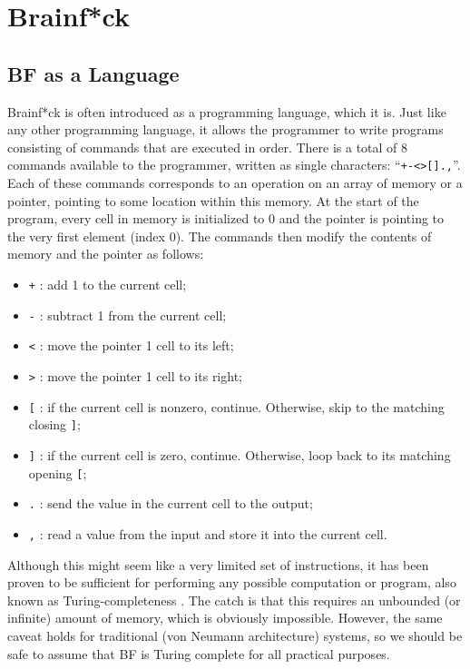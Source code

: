 \section{Brainf*ck}\label{section:brainfck}                                                       
\subsection{BF as a Language}
Brainf*ck is often introduced as a programming language, which it is. Just like any other programming language, it allows the programmer to write programs consisting of commands that are executed in order. There is a total of 8 commands available to the programmer, written as single characters: ``\texttt{+-<>[].,}''. Each of these commands corresponds to an operation on an array of memory or a pointer, pointing to some location within this memory. At the start of the program, every cell in memory is initialized to 0 and the pointer is pointing to the very first element (index 0). The commands then modify the contents of memory and the pointer as follows:
\begin{itemize}
\item \texttt{+} : add 1 to the current cell;
\item \texttt{-} : subtract 1 from the current cell;
\item \texttt{<} : move the pointer 1 cell to its left;
\item \texttt{>} : move the pointer 1 cell to its right;
\item \texttt{[} : if the current cell is nonzero, continue. Otherwise, skip to the matching closing \texttt{]};
\item \texttt{]} : if the current cell is zero, continue. Otherwise, loop back to its matching opening \texttt{[};
\item \texttt{.} : send the value in the current cell to the output;
\item \texttt{,} : read a value from the input and store it into the current cell.
\end{itemize}
Although this might seem like a very limited set of instructions, it has been proven to be sufficient for performing any possible computation or program, also known as Turing-completeness \cite{esolang}. The catch is that this requires an unbounded (or infinite) amount of memory, which is obviously impossible. However, the same caveat holds for traditional (von Neumann architecture) systems, so we should be safe to assume that BF is Turing complete for all practical purposes.

